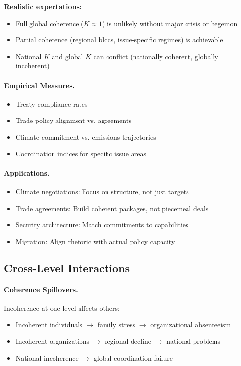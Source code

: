 \documentclass[12pt,a4paper]{article}
\begin{document}
\textbf{Realistic expectations:}
\begin{itemize}
  \item Full global coherence ($K \approx 1$) is unlikely without major crisis or hegemon
  \item Partial coherence (regional blocs, issue-specific regimes) is achievable
  \item National $K$ and global $K$ can conflict (nationally coherent, globally incoherent)
\end{itemize}

\paragraph{Empirical Measures.}
\begin{itemize}
  \item Treaty compliance rates
  \item Trade policy alignment vs. agreements
  \item Climate commitment vs. emissions trajectories
  \item Coordination indices for specific issue areas
\end{itemize}

\paragraph{Applications.}
\begin{itemize}
  \item Climate negotiations: Focus on structure, not just targets
  \item Trade agreements: Build coherent packages, not piecemeal deals
  \item Security architecture: Match commitments to capabilities
  \item Migration: Align rhetoric with actual policy capacity
\end{itemize}

\subsection{Cross-Level Interactions}

\paragraph{Coherence Spillovers.}
Incoherence at one level affects others:
\begin{itemize}
  \item Incoherent individuals $\rightarrow$ family stress $\rightarrow$ organizational absenteeism
  \item Incoherent organizations $\rightarrow$ regional decline $\rightarrow$ national problems
  \item National incoherence $\rightarrow$ global coordination failure
\end{itemize}
\end{document}
